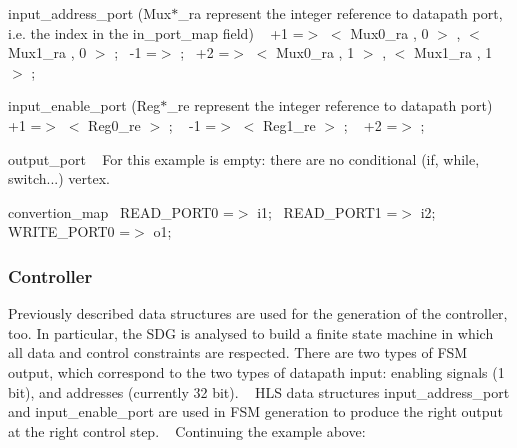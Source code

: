 \begin{DoxyItemize}
\item input\+\_\+address\+\_\+port (Mux$\ast$\+\_\+ra represent the integer reference to datapath port, i.\+e. the index in the in\+\_\+port\+\_\+map field) ~\newline
 +1 =$>$ $<$ Mux0\+\_\+ra , 0 $>$ , $<$ Mux1\+\_\+ra , 0 $>$ ;~\newline
 -\/1 =$>$ ;~\newline
 +2 =$>$ $<$ Mux0\+\_\+ra , 1 $>$ , $<$ Mux1\+\_\+ra , 1 $>$ ;~\newline

\item input\+\_\+enable\+\_\+port (Reg$\ast$\+\_\+re represent the integer reference to datapath port) ~\newline
 +1 =$>$ $<$ Reg0\+\_\+re $>$ ; ~\newline
 -\/1 =$>$ $<$ Reg1\+\_\+re $>$ ; ~\newline
 +2 =$>$ ; ~\newline

\item output\+\_\+port ~\newline
 For this example is empty\+: there are no conditional (if, while, switch...) vertex.~\newline

\item convertion\+\_\+map~\newline
 R\+E\+A\+D\+\_\+\+P\+O\+R\+T0 =$>$ i1;~\newline
 R\+E\+A\+D\+\_\+\+P\+O\+R\+T1 =$>$ i2;~\newline
 W\+R\+I\+T\+E\+\_\+\+P\+O\+R\+T0 =$>$ o1;~\newline
 
\end{DoxyItemize}\hypertarget{src_HLS_page_Controller}{}\subsubsection{Controller}\label{src_HLS_page_Controller}
Previously described data structures are used for the generation of the controller, too. In particular, the S\+DG is analysed to build a finite state machine in which all data and control constraints are respected. There are two types of F\+SM output, which correspond to the two types of datapath input\+: enabling signals (1 bit), and addresses (currently 32 bit). ~\newline
H\+LS data structures input\+\_\+address\+\_\+port and input\+\_\+enable\+\_\+port are used in F\+SM generation to produce the right output at the right control step. ~\newline
Continuing the example above\+:~\newline

